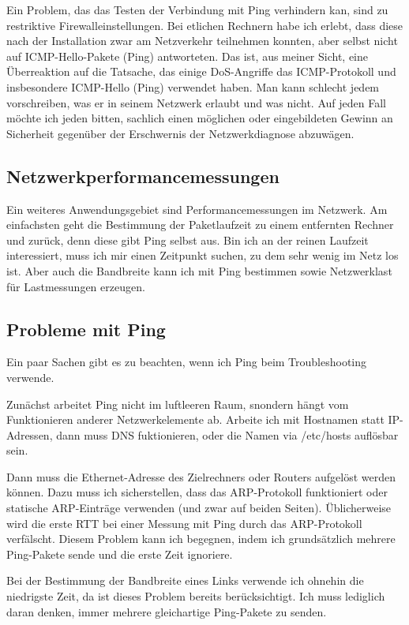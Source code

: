 \begin{normaltext}
  Ein Problem, das das Testen der Verbindung mit Ping verhindern kan, sind zu
  restriktive Firewalleinstellungen. Bei etlichen Rechnern habe ich erlebt,
  dass diese nach der Installation zwar am Netzverkehr teilnehmen konnten,
  aber selbst nicht auf ICMP-Hello-Pakete (Ping) antworteten. Das ist, aus
  meiner Sicht, eine Überreaktion auf die Tatsache, das einige DoS-Angriffe
  das ICMP-Protokoll und insbesondere ICMP-Hello (Ping) verwendet haben. Man
  kann schlecht jedem vorschreiben, was er in seinem Netzwerk erlaubt und was
  nicht. Auf jeden Fall möchte ich jeden bitten, sachlich einen möglichen oder
  eingebildeten Gewinn an Sicherheit gegenüber der Erschwernis der
  Netzwerkdiagnose abzuwägen.

  \subsection{Netzwerkperformancemessungen}
  Ein weiteres Anwendungsgebiet sind Performancemessungen im Netzwerk. Am
  einfachsten geht die Bestimmung der Paketlaufzeit zu einem entfernten
  Rechner und zurück, denn diese gibt Ping selbst aus. Bin ich an der reinen
  Laufzeit interessiert, muss ich mir einen Zeitpunkt suchen, zu dem sehr
  wenig im Netz los ist. Aber auch die Bandbreite kann ich mit Ping bestimmen
  sowie Netzwerklast für Lastmessungen erzeugen.

  \subsection{Probleme mit Ping}
  Ein paar Sachen gibt es zu beachten, wenn ich Ping beim Troubleshooting
  verwende.

  Zunächst arbeitet Ping nicht im luftleeren Raum, snondern hängt vom
  Funktionieren anderer Netzwerkelemente ab. Arbeite ich mit Hostnamen statt
  IP-Adressen, dann muss DNS fuktionieren, oder die Namen via /etc/hosts
  auflösbar sein.

  Dann muss die Ethernet-Adresse des Zielrechners oder Routers aufgelöst
  werden können. Dazu muss ich sicherstellen, dass das ARP-Protokoll
  funktioniert oder statische ARP-Einträge verwenden (und zwar auf beiden
  Seiten). Üblicherweise wird die erste RTT bei einer Messung mit Ping durch
  das ARP-Protokoll verfälscht. Diesem Problem kann ich begegnen, indem ich
  grundsätzlich mehrere Ping-Pakete sende und die erste Zeit ignoriere.

  Bei der Bestimmung der Bandbreite eines Links verwende ich ohnehin die
  niedrigste Zeit, da ist dieses Problem bereits berücksichtigt. Ich muss
  lediglich daran denken, immer mehrere gleichartige Ping-Pakete zu senden.


\end{normaltext}
